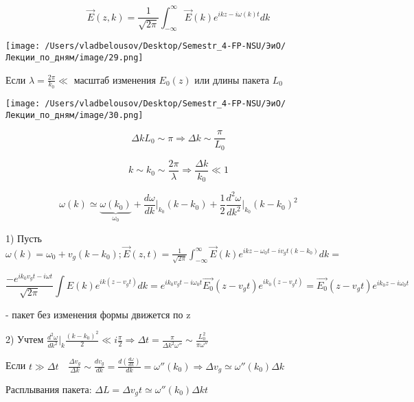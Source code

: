 \documentclass[12pt, a4paper]{report}
\begin{document}
\[ \vec{E }  ( z, k  ) =\frac{1}{\sqrt{2 \pi}}  \int_{-\infty}^{\infty} \vec{E }  ( k ) e^{ikz - i\omega(k ) t }   dk\] 

\begin{center}
    \texttt{[image: /Users/vladbelousov/Desktop/Semestr\_4-FP-NSU/ЭиО/Лекции\_по\_дням/image/29.png]}
\end{center}

Если \(\displaystyle  \lambda = \frac{2\pi}{k_0} \ll   \) масштаб изменения \( E_0(z ) \) или длины пакета \( L_0 \)  

\begin{center}
    \texttt{[image: /Users/vladbelousov/Desktop/Semestr\_4-FP-NSU/ЭиО/Лекции\_по\_дням/image/30.png]}
\end{center}

\[ \Delta k L_0 \sim \pi \Rightarrow \Delta k \sim \frac{\pi}{L_0}   \] 

\[ k \sim k_0 \sim \frac{2 \pi }{\lambda} \Rightarrow \frac{\Delta  k }{k_0 } \ll 1     \] 


\[ \omega ( k ) \simeq \underbrace{\omega( k_0 )}_{\omega_0} + \frac{d \omega }{ dk} \bigg|_{k_0}  (k- k_0 ) + \frac{1}{ 2 }  \frac{ d ^2 \omega } { d k ^2 }  \bigg|_{k_0}  (k-k_0 ) ^2    \] 

1) Пусть \(\displaystyle  \omega ( k ) = \omega_0 + v_g ( k-k_0 ) ; \vec{E } ( z,t ) = \frac{1}{\sqrt{2 \pi } } \int_{-\infty}^{\infty}  \vec{E }  ( k ) e^{ikz - \omega_0t - i v_gt ( k-k_0)}  dk = \) 

\[ \frac{- e^{i k_0 v_gt -i \omega t} }{\sqrt{2\pi } }\int  E(k ) e ^{i k (z- v_gt )}dk  = e^{i k_0 v_gt - i \omega_0 t} \vec{E_0} ( z- v_gt ) e^{i k_0 (z- v_gt )}= \vec{E_0} ( z- v_gt  ) e^{i k_0 z - i \omega_0 t }        \] 

- пакет без изменения формы движется по z 

2) Учтем \( \displaystyle \frac{d ^2\omega }{dk ^2 } \bigg |_k \frac{(k-k_0 ) ^2 }{2} \ll i \frac{\pi}{2 }  \Rightarrow \Delta t = \frac{\pi}{\Delta k ^2 \omega ''}\sim \frac{ L_0 ^2 }{ \pi \omega ''}        \) 

Если \( \displaystyle t \gg \Delta t    \quad  \frac{\Delta v_g }{\Delta k } \sim \frac{d v_g }{dk } = \frac{d \left( \frac{d \omega}{dk}  \right)}{dk}= \omega '' (k_0 ) \Rightarrow \Delta v_g \simeq \omega '' (k_0 )\Delta k       \) 

Расплывания пакета: \( \Delta L= \Delta v_g t \simeq \omega '' ( k_0 ) \Delta k t   \) 
\end{document}
